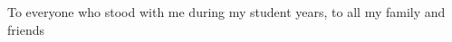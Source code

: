 \dedicatory

To everyone who stood with me during my student years, to all my family and friends

\enddedicatory